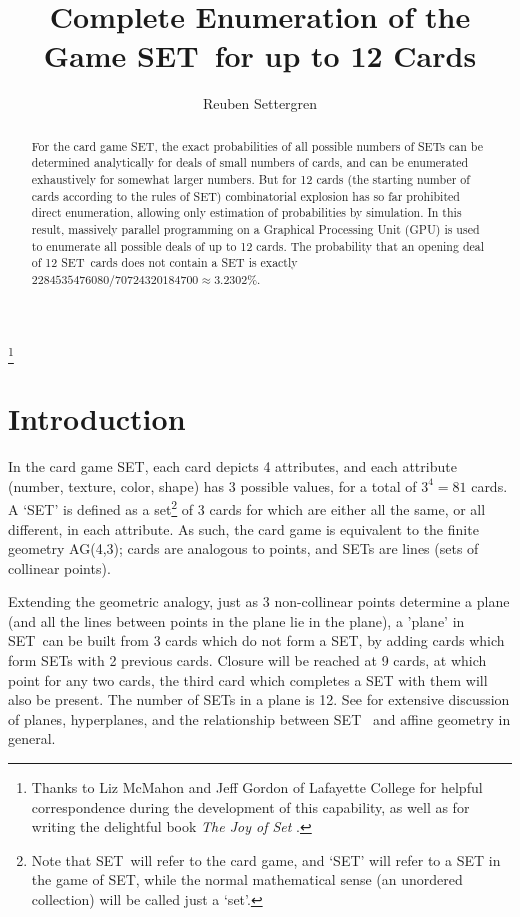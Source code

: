 \documentclass[10pt]{amsart}
\newcommand{\SETb}{SET\texttrademark\ } %
\newcommand{\SET}{SET\texttrademark}  %
\begin{document}
\title[SET Enumeration]{Complete Enumeration of the Game \SETb for up to 12 Cards}
\author[Settergren]{Reuben Settergren}

\thanks{Thanks to Liz McMahon and Jeff Gordon of Lafayette College for helpful
  correspondence during the development of this capability, as well as for
  writing the delightful book {\em The Joy of Set} \cite{JOS}.}

\maketitle

\begin{abstract}
For the card game \SET, the exact probabilities of all possible numbers of SETs
can be determined analytically for deals of small numbers of cards, and can be
enumerated exhaustively for somewhat larger numbers. But for 12 cards (the
starting number of cards according to the rules of \SET) combinatorial explosion
has so far prohibited direct enumeration, allowing only estimation of
probabilities by simulation. In this result, massively parallel programming on a
Graphical Processing Unit (GPU) is used to enumerate all possible deals of up to
12 cards. The probability that an opening deal of 12 \SETb cards does not
contain a SET is exactly $2284535476080/70724320184700 \approx 3.2302\%$.
\end{abstract}

\section{Introduction}
In the card game \SET, each card depicts 4 attributes, and each attribute
(number, texture, color, shape) has 3 possible values, for a total of $3^4=81$
cards. A `SET' is defined as a set\footnote{Note that \SETb will refer to the
  card game, and `SET' will refer to a SET in the game of \SET, while the normal
  mathematical sense (an unordered collection) will be called just a `set'.} of
3 cards for which are either all the same, or all different, in each
attribute. As such, the card game is equivalent to the finite geometry AG(4,3);
cards are analogous to points, and SETs are lines (sets of collinear
points).

Extending the geometric analogy, just as 3 non-collinear points determine a
plane (and all the lines between points in the plane lie in the plane), a
'plane' in \SETb can be built from 3 cards which do not form a SET, by adding
cards which form SETs with 2 previous cards. Closure will be reached at 9 cards,
at which point for any two cards, the third card which completes a SET with them
will also be present. The number of SETs in a plane is 12. See \cite{JOS} for
extensive discussion of planes, hyperplanes, and the relationship between \SETb
and affine geometry in general.
\end{document}
